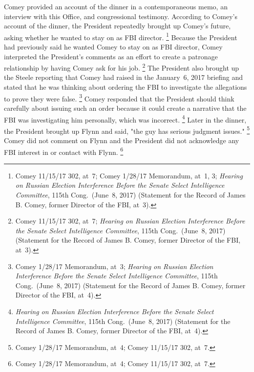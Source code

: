 Comey provided an account of the dinner in a contemporaneous memo, an interview with this Office, and congressional testimony.
According to Comey's account of the dinner, the President repeatedly brought up Comey's future, asking whether he wanted to stay on as FBI director.%
\footnote{Comey 11/15/17 302, at~7;
Comey 1/28/17 Memorandum, at~1, 3;
\textit{Hearing on Russian Election Interference Before the Senate Select Intelligence Committee}, 115th Cong.\ (June~8, 2017) (Statement for the Record of James B. Comey, former Director of the FBI, at~3).}
Because the President had previously said he wanted Comey to stay on as FBI director, Comey interpreted the President's comments as an effort to create a patronage relationship by having Comey ask for his job.%
\footnote{Comey 11/15/17 302, at~7;
\textit{Hearing on Russian Election Interference Before the Senate Select Intelligence Committee}, 115th Cong.\ (June~8, 2017) (Statement for the Record of James B. Comey, former Director of the FBI, at~3).}
The President also brought up the Steele reporting that Comey had raised in the January~6, 2017 briefing and stated that he was thinking about ordering the FBI to investigate the allegations to prove they were false.%
\footnote{Comey 1/28/17 Memorandum, at~3;
\textit{Hearing on Russian Election Interference Before the Senate Select Intelligence Committee}, 115th Cong.\ (June~8, 2017) (Statement for the Record of James B. Comey, former Director of the FBI, at~4).}
Comey responded that the President should think carefully about issuing such an order because it could create a narrative that the FBI was investigating him personally, which was incorrect.%
\footnote{\textit{Hearing on Russian Election Interference Before the Senate Select Intelligence Committee}, 115th Cong.\ (June~8, 2017) (Statement for the Record of James B. Comey, former Director of the FBI, at~4).}
Later in the dinner, the President brought up Flynn and said, "the guy has serious judgment issues."%
\footnote{Comey 1/28/17 Memorandum, at~4;
Comey 11/15/17 302, at~7.}
Comey did not comment on Flynn and the President did not acknowledge any FBI interest in or contact with Flynn.%
\footnote{Comey 1/28/17 Memorandum, at~4;
Comey 11/15/17 302, at~7.}

